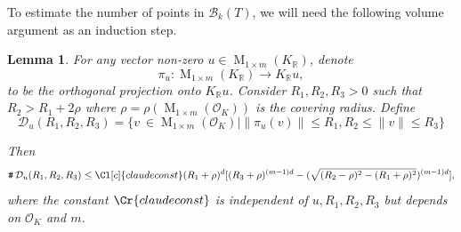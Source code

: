 \documentclass{amsart}
\newtheorem{lemma}[theorem]{Lemma}
\theoremstyle{definition}
\theoremstyle{remark}
\newcommand{\OK}{\mathcal{O}_K}
\newcommand{\KR}{K_\mathbb{R}}
\DeclareMathOperator{\M}{M}
\DeclareMathOperator{\card}{\texttt{\#}}
\begin{document}
\iffalse
To estimate the number of points in $\mathcal{B}_{k}(T)$, we will need the following volume argument as an induction step.
\begin{lemma}
    \label{le:counting_ortho}
    For any vector non-zero $u \in \M_{1 \times m}(\KR)$, denote 
    \begin{equation}
        \pi_{u}: \M_{1 \times m}( \KR) \rightarrow  \KR u,
    \end{equation}
    to be the orthogonal projection onto $\KR u$. 
    Consider $R_{1},R_{2},R_{3} > 0$ such that $R_{2} > R_{1} + 2 \rho$
    where $\rho = \rho(\M_{1 \times m}(\OK))$ is the covering radius.
    Define 
    \begin{equation}
        \mathcal{D}_{u}(R_{1},R_{2},R_{3}) = 
        \{ v\ \in \M_{1 \times m}(\OK) \mid \| \pi_{u}(v)\| \leq R_{1}, R_{2} \leq \|v\| \leq R_{3}\}
    \end{equation}

    Then
    \begin{equation}
        \card \mathcal{D}_{u}(R_{1},R_{2},R_{3}) \leq 
        \Cl[c]{claudeconst} (R_{1}+\rho)^{d} [(R_{3} + \rho)^{(m-1)d} - ( \sqrt{(R_{2}-\rho)^{2} - (R_{1} + \rho)^{2}})^{(m-1)d} ] ,
    \end{equation}
    where the constant $\Cr{claudeconst}$ is independent of $u,R_{1},R_{2},R_{3}$ but depends on $\OK$ and $m$. 
\end{lemma}
\end{document}
